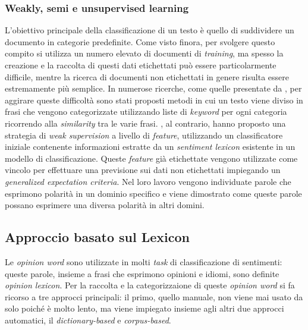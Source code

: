 \documentclass[a4paper,12pt,openright,twoside]{report}
\theoremstyle{definition}
\begin{document}
\subsubsection{Weakly, semi e unsupervised learning}
L'obiettivo principale della classificazione di un testo è quello di suddividere un documento in categorie
predefinite. Come visto finora, per svolgere questo compito si utilizza un numero elevato di documenti di \emph{training},
 ma spesso la creazione e la raccolta di questi dati etichettati può essere particolarmente difficile,
 mentre
la ricerca di documenti non etichettati in genere risulta essere estremamente più semplice.
In numerose ricerche, come quelle presentate da \cite{Ko2000},
per aggirare queste difficoltà sono stati proposti metodi in cui un testo viene diviso in frasi che vengono categorizzate utilizzando liste
di \emph{keyword} per ogni categoria ricorrendo alla \emph{similarity} tra le varie frasi.
\cite{He2011}, al contrario,
hanno proposto una strategia di \emph{weak supervision} a  livello di \emph{feature},
utilizzando un classificatore iniziale contenente informazioni estratte da un \emph{sentiment lexicon} esistente
in un modello di classificazione. Queste \emph{feature} già etichettate vengono utilizzate come vincolo per effettuare
una previsione sui dati non etichettati impiegando un \emph{generalized expectation criteria}.
Nel loro lavoro vengono individuate parole che esprimono polarità in un dominio specifico e viene dimostrato
come queste parole possano esprimere una diversa polarità in altri domini.
\subsection{Approccio basato sul Lexicon}
Le \emph{opinion word} sono utilizzate in molti \emph{task} di classificazione di sentimenti: queste parole,
insieme a frasi che esprimono opinioni e idiomi, sono definite \emph{opinion lexicon}. 
Per la raccolta e la categorizzaione di queste \emph{opinion word} si 
fa ricorso a tre approcci principali: il primo,
quello manuale, non viene mai usato da solo poiché è molto lento, ma viene impiegato insieme agli
altri due approcci automatici, il \emph{dictionary-based} e \emph{corpus-based}.
\end{document}
